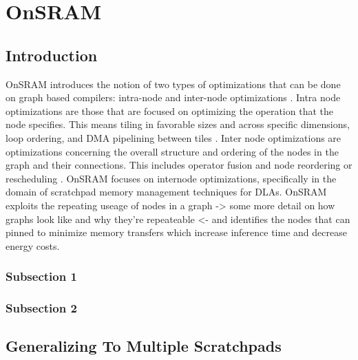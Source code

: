 
\chapter{OnSRAM} %

\label{Chapter3} %


\section{Introduction}

OnSRAM introduces the notion of two types of optimizations that can be done on
graph based compilers: intra-node and inter-node optimizations \cite{onsram}.
Intra node optimizations are those that are focused on optimizing the operation
that the node specifies. This means tiling in favorable sizes and across
specific dimensions, loop ordering, and DMA pipelining
between tiles \cite{Aladdin}.
Inter node optimizations are optimizations concerning the overall structure and
ordering of the nodes in the graph and their connections. This includes
operator fusion and node reordering or rescheduling \cite{onsram}.
OnSRAM focuses on internode optimizations, specifically in the domain of
scratchpad memory management techniques for DLAs. OnSRAM exploits the 
repeating useage of nodes in a graph -> some more detail on how graphs look like and why they're repeateable <-
and identifies the nodes that can pinned to minimize memory transfers which increase inference time and decrease energy costs.


\subsection{Subsection 1}



\subsection{Subsection 2}



\section{Generalizing To Multiple Scratchpads}

